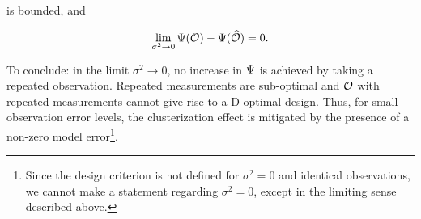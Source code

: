 is bounded, and



\begin{equation*}
\lim_{\sigma^2 \to 0} \tar(\obs) -\tar(\obsm) = 0.
\end{equation*}

To conclude: in the limit $\sigma^2 \to 0$, no increase in $\Psi$ is
achieved by taking a repeated observation. Repeated measurements are
sub-optimal and $\mathcal{O}$ with repeated measurements cannot give rise to
a D-optimal design. Thus, for small observation error levels, the
clusterization effect is mitigated by the presence of a non-zero model
error\footnote{Since the design criterion is not defined for $\sigma^2
= 0$ and identical observations, we cannot make a statement regarding
$\sigma^2 = 0$, except in the limiting sense described above.}.
